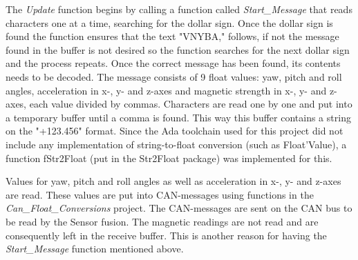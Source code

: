The \emph{Update} function begins by calling a function called \newline
\emph{Start\_Message} that reads characters one at a time, searching for the dollar sign. Once the dollar sign is found the function ensures that the text "VNYBA," follows, if not the message found in the buffer is not desired so the function searches for the next dollar sign and the process repeats. \newline
Once the correct message has been found, its contents needs to be decoded. The message consists of 9 float values: yaw, pitch and roll angles, acceleration in x-, y- and z-axes and magnetic strength in x-, y- and z-axes, each value divided by commas. \newline
Characters are read one by one and put into a temporary buffer until a comma is found. This way this buffer contains a string on the "+123.456" format. Since the Ada toolchain used for this project did not include any implementation of string-to-float conversion (such as Float'Value), a function fStr2Float (put in the Str2Float package) was implemented for this.

Values for yaw, pitch and roll angles as well as acceleration in x-, y- and z-axes are read. These values are put into CAN-messages using functions in the \emph{Can\_Float\_Conversions} project. The CAN-messages are sent on the CAN bus to be read by the Sensor fusion. \newline
The magnetic readings are not read and are consequently left in the receive buffer. This is another reason for having the \emph{Start\_Message} function mentioned above.

